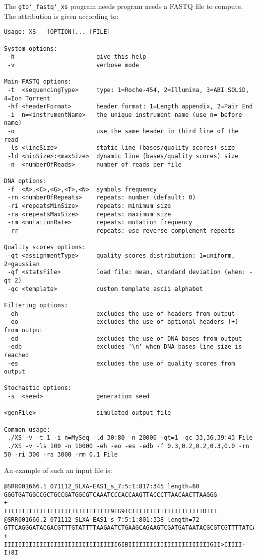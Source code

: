 The \texttt{gto\char`_fastq\char`_xs} program needs program needs a FASTQ file to compute.\\
The attribution is given according to:
\begin{lstlisting}
Usage: XS   [OPTION]... [FILE] 

System options:
 -h                       give this help
 -v                       verbose mode

Main FASTQ options:
 -t  <sequencingType>     type: 1=Roche-454, 2=Illumina, 3=ABI SOLiD, 4=Ion Torrent
 -hf <headerFormat>       header format: 1=Length appendix, 2=Pair End
 -i  n=<instrumentName>   the unique instrument name (use n= before name)
 -o                       use the same header in third line of the read
 -ls <lineSize>           static line (bases/quality scores) size
 -ld <minSize>:<maxSize>  dynamic line (bases/quality scores) size
 -n  <numberOfReads>      number of reads per file

DNA options:
 -f  <A>,<C>,<G>,<T>,<N>  symbols frequency
 -rn <numberOfRepeats>    repeats: number (default: 0)
 -ri <repeatsMinSize>     repeats: minimum size
 -ra <repeatsMaxSize>     repeats: maximum size
 -rm <mutationRate>       repeats: mutation frequency
 -rr                      repeats: use reverse complement repeats

Quality scores options:
 -qt <assignmentType>     quality scores distribution: 1=uniform, 2=gaussian
 -qf <statsFile>          load file: mean, standard deviation (when: -qt 2)
 -qc <template>           custom template ascii alphabet

Filtering options:
 -eh                      excludes the use of headers from output
 -eo                      excludes the use of optional headers (+) from output
 -ed                      excludes the use of DNA bases from output
 -edb                     excludes '\n' when DNA bases line size is reached
 -es                      excludes the use of quality scores from output

Stochastic options:
 -s  <seed>               generation seed

<genFile>                 simulated output file

Common usage:
 ./XS -v -t 1 -i n=MySeq -ld 30:80 -n 20000 -qt=1 -qc 33,36,39:43 File
 ./XS -v -ls 100 -n 10000 -eh -eo -es -edb -f 0.3,0.2,0.2,0.3,0.0 -rn 50 -ri 300 -ra 3000 -rm 0.1 File
\end{lstlisting}
An example of such an input file is:
\begin{lstlisting}
@SRR001666.1 071112_SLXA-EAS1_s_7:5:1:817:345 length=60
GGGTGATGGCCGCTGCCGATGGCGTCAAATCCCACCAAGTTACCCTTAACAACTTAAGGG
+
IIIIIIIIIIIIIIIIIIIIIIIIIIIIII9IG9ICIIIIIIIIIIIIIIIIIIIIDIII
@SRR001666.2 071112_SLXA-EAS1_s_7:5:1:801:338 length=72
GTTCAGGGATACGACGTTTGTATTTTAAGAATCTGAAGCAGAAGTCGATGATAATACGCGTCGTTTTATCAT
+
IIIIIIIIIIIIIIIIIIIIIIIIIIIIIIII6IBIIIIIIIIIIIIIIIIIIIIIIIGII>IIIII-I)8I
\end{lstlisting}

